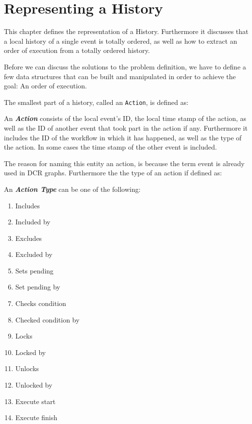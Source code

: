 \chapter{Representing a History}\label{chap:representing-a-history}
	This chapter defines the representation of a History. Furthermore it discusses that a local history of a single event is totally ordered, as well as how to extract an order of execution from a totally ordered history.

	\newpar Before we can discuss the solutions to the problem definition, we have to define a few data structures that can be built and manipulated in order to achieve the goal: An order of execution.
	
	\newpar The smallest part of a history, called an \texttt{Action}, is defined as:
	
	\begin{definition}
		An \textit{\textbf{Action}} consists of the local event's ID, the local time stamp of the action, as well as the ID of another event that took part in the action if any. Furthermore it includes the ID of the workflow in which it has happened, as well as the type of the action. In some cases the time stamp of the other event is included.
	\end{definition}
	
	\noindent The reason for naming this entity an action, is because the term event is already used in DCR graphs. Furthermore the the type of an action if defined as:
	
	\begin{definition}
		An \textit{\textbf{Action Type}} can be one of the following:
		\begin{multicols}{3}
			\begin{enumerate}
				\item Includes
				\item Included by
				\item Excludes
				\item Excluded by
				\item Sets pending
				\item Set pending by
				\item Checks condition
				\item Checked condition by
				\item Locks
				\item Locked by
				\item Unlocks
				\item Unlocked by
				\item Execute start
				\item Execute finish
			\end{enumerate}
		\end{multicols}
	\end{definition}
	
